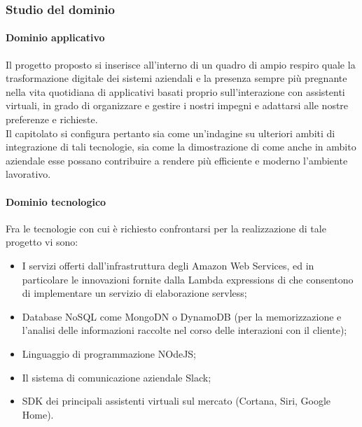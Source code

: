 		\subsubsection{Studio del dominio}
			\paragraph{Dominio applicativo}
			Il progetto proposto si inserisce all'interno di un quadro di ampio respiro quale la trasformazione digitale dei sistemi aziendali e la 
			presenza sempre più pregnante nella vita quotidiana di applicativi basati proprio sull'interazione con assistenti virtuali, in grado di 
			organizzare e gestire i nostri impegni e adattarsi alle nostre preferenze e richieste.\\
			Il capitolato si configura pertanto sia come un'indagine su ulteriori ambiti di integrazione di tali tecnologie, sia come la dimostrazione 
			di come anche in ambito aziendale esse possano contribuire a rendere più efficiente e moderno l'ambiente lavorativo.
			\paragraph{Dominio tecnologico}
			Fra le tecnologie con cui è richiesto confrontarsi per la realizzazione di tale progetto vi sono:
			\begin{itemize}
				\item I servizi offerti dall'infrastruttura degli Amazon Web Services, ed in particolare le innovazioni fornite dalla Lambda expressions 
				di  che consentono di implementare un servizio di elaborazione servless;
				\item Database NoSQL come MongoDN o DynamoDB (per la memorizzazione e l'analisi delle informazioni raccolte nel corso delle interazioni con il cliente);
				\item Linguaggio di programmazione NOdeJS;
				\item Il sistema di comunicazione aziendale Slack;
				\item SDK dei principali assistenti virtuali sul mercato (Cortana, Siri, Google Home).
			\end{itemize}
